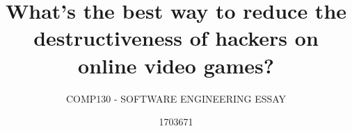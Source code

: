 \documentclass{scrartcl}
\title{What's the best way to reduce the destructiveness of hackers on online video games?}
\subtitle{COMP130 - SOFTWARE ENGINEERING ESSAY}
\author{1703671}
\begin{document}
\maketitle

\abstract{}
\cite{PMT}



\end{document}
